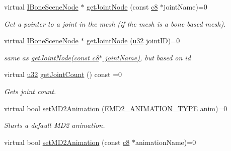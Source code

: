 \begin{DoxyCompactItemize}
virtual \hyperlink{classirr_1_1scene_1_1IBoneSceneNode}{I\+Bone\+Scene\+Node} $\ast$ \hyperlink{classirr_1_1scene_1_1IAnimatedMeshSceneNode_ac7b64a5ddbe5d570dc5276b894a63619}{get\+Joint\+Node} (const \hyperlink{namespaceirr_a9395eaea339bcb546b319e9c96bf7410}{c8} $\ast$joint\+Name)=0
\begin{DoxyCompactList}\small\item\em Get a pointer to a joint in the mesh (if the mesh is a bone based mesh). \end{DoxyCompactList}\item 
\mbox{\label{classirr_1_1scene_1_1IAnimatedMeshSceneNode_a790a1a03ada0eb754504609d76c5fcc1}} 
virtual \hyperlink{classirr_1_1scene_1_1IBoneSceneNode}{I\+Bone\+Scene\+Node} $\ast$ \hyperlink{classirr_1_1scene_1_1IAnimatedMeshSceneNode_a790a1a03ada0eb754504609d76c5fcc1}{get\+Joint\+Node} (\hyperlink{namespaceirr_a0416a53257075833e7002efd0a18e804}{u32} joint\+ID)=0
\begin{DoxyCompactList}\small\item\em same as \hyperlink{classirr_1_1scene_1_1IAnimatedMeshSceneNode_ac7b64a5ddbe5d570dc5276b894a63619}{get\+Joint\+Node(const c8$\ast$ joint\+Name)}, but based on id \end{DoxyCompactList}\item 
virtual \hyperlink{namespaceirr_a0416a53257075833e7002efd0a18e804}{u32} \hyperlink{classirr_1_1scene_1_1IAnimatedMeshSceneNode_a146657063c055fcb951ca6fd66171589}{get\+Joint\+Count} () const =0
\begin{DoxyCompactList}\small\item\em Gets joint count. \end{DoxyCompactList}\item 
virtual bool \hyperlink{classirr_1_1scene_1_1IAnimatedMeshSceneNode_aca2ca2593857c60aac61c0fd78365d2d}{set\+M\+D2\+Animation} (\hyperlink{namespaceirr_1_1scene_a08d4a84966e1d2886d0d57e4acbb4f19}{E\+M\+D2\+\_\+\+A\+N\+I\+M\+A\+T\+I\+O\+N\+\_\+\+T\+Y\+PE} anim)=0
\begin{DoxyCompactList}\small\item\em Starts a default M\+D2 animation. \end{DoxyCompactList}\item 
virtual bool \hyperlink{classirr_1_1scene_1_1IAnimatedMeshSceneNode_a8732866332327a7d43b91f41b5549fe3}{set\+M\+D2\+Animation} (const \hyperlink{namespaceirr_a9395eaea339bcb546b319e9c96bf7410}{c8} $\ast$animation\+Name)=0

\end{DoxyCompactItemize}
